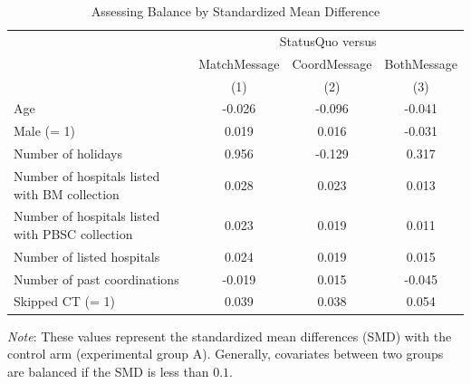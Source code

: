 \documentclass[12pt, a4paper]{article}
\begin{document}
\begin{table}[H]

\caption{\label{tab:smd-balance}Assessing Balance by Standardized Mean Difference}
\centering
\fontsize{8}{10}\selectfont
\begin{threeparttable}
\begin{tabular}[t]{lccc}
\toprule
\multicolumn{1}{c}{ } & \multicolumn{3}{c}{StatusQuo versus} \\
\cmidrule(l{3pt}r{3pt}){2-4}
\multicolumn{1}{c}{ } & \multicolumn{1}{c}{MatchMessage} & \multicolumn{1}{c}{CoordMessage} & \multicolumn{1}{c}{BothMessage} \\
\cmidrule(l{3pt}r{3pt}){2-2} \cmidrule(l{3pt}r{3pt}){3-3} \cmidrule(l{3pt}r{3pt}){4-4}
 & (1) & (2) & (3)\\
\midrule
Age & -0.026 & -0.096 & -0.041\\
Male (= 1) & 0.019 & 0.016 & -0.031\\
Number of holidays & 0.956 & -0.129 & 0.317\\
Number of hospitals listed with BM collection & 0.028 & 0.023 & 0.013\\
Number of hospitals listed with PBSC collection & 0.023 & 0.019 & 0.011\\
Number of listed hospitals & 0.024 & 0.019 & 0.015\\
Number of past coordinations & -0.019 & 0.015 & -0.045\\
Skipped CT (= 1) & 0.039 & 0.038 & 0.054\\
\bottomrule
\end{tabular}
\begin{tablenotes}
\item \emph{Note}: These values represent the standardized mean differences (SMD) with the control arm (experimental group A). Generally, covariates between two groups are balanced if the SMD is less than $0.1$.
\end{tablenotes}
\end{threeparttable}
\end{table}
\end{document}
